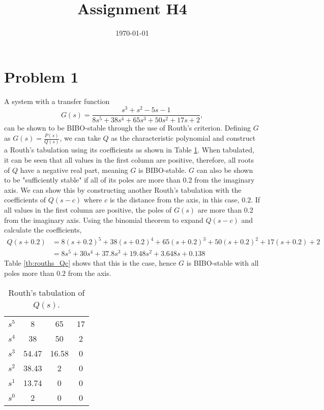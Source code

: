 \documentclass[10pt,a4paper]{article}
\date{\today}
\title{Assignment H4}
\begin{document}
    \header{}
    \section{Problem 1} 
        A system with a transfer function
        \begin{equation}
            G(s) = \frac{s^3 + s^2 - 5s -1}{8s^5 + 38s^4 + 65s^3 + 50s^2 + 17s + 2},
        \end{equation}
        can be shown to be BIBO-stable through the use of Routh's criterion. Defining $G$ as $G(s) = \frac{P(s)}{Q(s)}$, we can take $Q$ as the characteristic polynomial and construct a Routh's tabulation using its coefficients as shown in Table \ref{tb:rouths_Q}. When tabulated, it can be seen that all values in the first column are positive, therefore, all roots of $Q$ have a negative real part, meaning $G$ is BIBO-stable. $G$ can also be shown to be "sufficiently stable" if all of its poles are more than $0.2$ from the imaginary axis. We can show this by constructing another Routh's tabulation with the coefficients of $Q(s - c)$ where $c$ is the distance from the axis, in this case, $0.2$. If all values in the first column are positive, the poles of $G(s)$ are more than $0.2$ from the imaginary axis. Using the binomial theorem to expand $Q(s-c)$ and calculate the coefficients, 
        \begin{align}
            Q(s + 0.2) &= 8(s + 0.2)^5 + 38(s + 0.2)^4 + 65(s + 0.2)^3 + 50(s + 0.2)^2 + 17(s + 0.2) + 2 \\
            &= 8s^5 + 30s^4 + 37.8s^3 + 19.48s^2 + 3.648s + 0.138
        \end{align}
        Table \ref{tb:rouths_Qc} shows that this is the case, hence $G$ is BIBO-stable with all poles more than $0.2$ from the axis.
        \begin{table}[h!]
            \centering
            \begin{tabular}{ c | c c c}
                $s^5$ & 8     & 65    & 17 \\
                $s^4$ & 38    & 50    & 2  \\
                $s^3$ & 54.47 & 16.58 & 0  \\
                $s^2$ & 38.43 & 2     & 0  \\
                $s^1$ & 13.74 & 0     & 0  \\
                $s^0$ & 2     & 0     & 0             
            \end{tabular}
            \caption{Routh's tabulation of $Q(s)$.}
            \label{tb:rouths_Q}
            \end{table}
\end{document}
